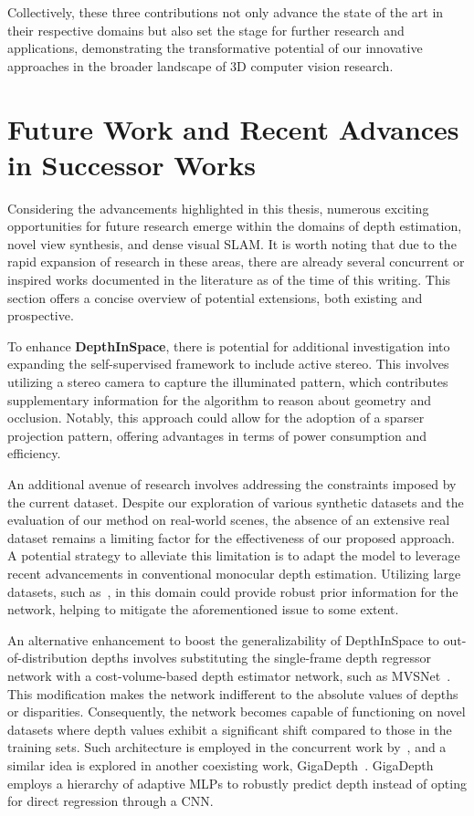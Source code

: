  Collectively, these three contributions not only advance the state of the art in their respective domains but also set the stage for further research and applications, demonstrating the transformative potential of our innovative approaches in the broader landscape of 3D computer vision research.

\section{Future Work and Recent Advances in Successor Works}

Considering the advancements highlighted in this thesis, numerous exciting opportunities for future research emerge within the domains of depth estimation, novel view synthesis, and dense visual SLAM. It is worth noting that due to the rapid expansion of research in these areas, there are already several concurrent or inspired works documented in the literature as of the time of this writing. This section offers a concise overview of potential extensions, both existing and prospective.


To enhance \textbf{DepthInSpace}, there is potential for additional investigation into expanding the self-supervised framework to include active stereo. This involves utilizing a stereo camera to capture the illuminated pattern, which contributes supplementary information for the algorithm to reason about geometry and occlusion. Notably, this approach could allow for the adoption of a sparser projection pattern, offering advantages in terms of power consumption and efficiency.

An additional avenue of research involves addressing the constraints imposed by the current dataset. Despite our exploration of various synthetic datasets and the evaluation of our method on real-world scenes, the absence of an extensive real dataset remains a limiting factor for the effectiveness of our proposed approach. A potential strategy to alleviate this limitation is to adapt the model to leverage recent advancements in conventional monocular depth estimation. Utilizing large datasets, such as~\cite{ranftl2020towards}, in this domain could provide robust prior information for the network, helping to mitigate the aforementioned issue to some extent.

An alternative enhancement to boost the generalizability of DepthInSpace to out-of-distribution depths involves substituting the single-frame depth regressor network with a cost-volume-based depth estimator network, such as MVSNet~\citep{yao2018mvsnet}. This modification makes the network indifferent to the absolute values of depths or disparities. Consequently, the network becomes capable of functioning on novel datasets where depth values exhibit a significant shift compared to those in the training sets. Such architecture is employed in the concurrent work by~\cite{li2023self}, and a similar idea is explored in another coexisting work, GigaDepth~\citep{schreiberhuber2022gigadepth}. GigaDepth employs a hierarchy of adaptive MLPs to robustly predict depth instead of opting for direct regression through a CNN.

